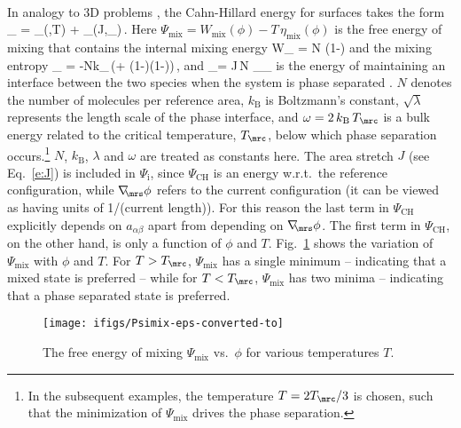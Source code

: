 \documentclass[11pt]{article}
\newcommand {\mrB}{\mathrm{B}}
\newcommand{\nablas}{\nabla_{\!\!\mrs}}
\newcommand{\kranthi}{\textcolor{magenta}}
\begin{document}
\\
In analogy to 3D problems \citep{cahn58-1}, the Cahn-Hillard energy for surfaces takes the form 
\Psi_ 
= \Psi_(\phi,T)  + \Psi_\mri(J,\nablas\phi)\,.
\label{e:WCH}\eqe
Here $\Psi_\mathrm{mix}=W_\mathrm{mix}(\phi)- T\,\eta_\mathrm{mix}(\phi)$ is the free energy of mixing that contains the internal mixing energy
W_ = N\omega\,\phi\,(1-\phi)
\eqe
and the mixing entropy 
\eta_ = -Nk_\mrB\,\big(\phi\ln\phi + (1-\phi)\ln(1-\phi)\big)\,,
\eqe
and 
\Psi_\mri = J\,N\,\omega\ds{}\,\nablas\phi\cdot\nablas\phi
\label{e:Psii}\eqe
is the energy of maintaining an interface between the two species when the system is phase separated \citep{embar13}.
$N$ denotes the number of molecules per reference area, $k_\mrB$ is Boltzmann's constant, $\sqrt{\lambda}$ represents the length scale of the phase interface, and $\omega = 2\,k_\mrB\,T_\mrc$ is a bulk energy related to the critical temperature, $T_\mrc$, below which phase separation occurs.\footnote{In the subsequent examples, the temperature $T = 2T_\mrc/3$ is chosen, such that the minimization of $\Psi_\mathrm{mix}$ drives the phase separation.} 
$N$, $k_\mrB$, $\lambda$ and $\omega$ are treated as constants here.
The area stretch $J$ (see Eq.~\eqref{e:J}) is included in $\Psi_\mathrm{i}$, since $\Psi_\mathrm{CH}$ is an energy w.r.t.~the reference configuration, while $\nablas\phi$ refers to the current configuration (it can be viewed as having units of 1/(current length)).
For this reason the last term in $\Psi_\mathrm{CH}$ explicitly depends on $a_{\alpha\beta}$ apart from depending on $\nablas\phi$.
The first term in $\Psi_\mathrm{CH}$, on the other hand, is only a function of $\phi$ and $T$.
Fig.~\ref{f:Psimix} shows the variation of $\Psi_\mathrm{mix}$ with $\phi$ and $T$.
For $T>T_\mrc$, $\Psi_\mathrm{mix}$ has a single minimum -- indicating that a mixed state is preferred -- while
for $T<T_\mrc$, $\Psi_\mathrm{mix}$ has two minima -- indicating that a phase separated state is preferred. 
\begin{figure}[H]
	\centering
	\texttt{[image: ifigs/Psimix-eps-converted-to]}
	\caption{The free energy of mixing $\Psi_\mathrm{mix}$ vs.~$\phi$ for various temperatures $T$.}
	\label{f:Psimix}
\end{figure}
\end{document}
